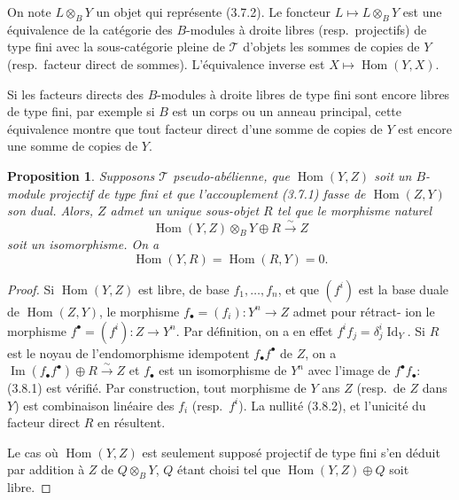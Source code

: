 \documentclass[11pt,a4paper]{article}
\theoremstyle{plain}
\newtheorem{proposition}[theorem]{Proposition}
\theoremstyle{definition}
\DeclareMathOperator{\Hom}{Hom}
\DeclareMathOperator{\im}{Im}
\newcommand{\isom}{\xrightarrow{\sim}}
\DeclareMathOperator{\Id}{Id}
\begin{document}
On note $L \otimes_B Y$ un objet qui repr\'esente (3.7.2). Le foncteur $L \mapsto L \otimes_B Y$ est une \'equivalence de la cat\'egorie des $B$-modules \`a droite libres (resp.~projectifs) de type fini avec la sous-cat\'egorie pleine de $\mathcal{T}$ d'objets les sommes de copies de $Y$ (resp.~facteur direct de sommes). L'\'equivalence inverse est $X \mapsto \Hom(Y, X)$.

Si les facteurs directs des $B$-modules \`a droite libres de type fini sont encore libres de type fini, par exemple si $B$ est un corps ou un anneau principal, cette \'equivalence montre que tout facteur direct d'une somme de copies de $Y$ est encore une somme de copies de $Y$.

\begin{proposition}
Supposons $\mathcal{T}$ pseudo-ab\'elienne, que $\Hom(Y, Z)$ soit un $B$-module projectif de type fini et que l'accouplement (3.7.1) fasse de $\Hom(Z, Y)$ son dual. Alors, $Z$ admet un unique sous-objet $R$ tel que le morphisme naturel
\begin{equation}
\Hom(Y, Z) \otimes_B Y \oplus R \isom Z \tag{3.8.1}
\end{equation}
soit un isomorphisme. On a
\begin{equation}
\Hom(Y, R) = \Hom(R, Y) = 0. \tag{3.8.2}
\end{equation}
\end{proposition}

\begin{proof}
Si $\Hom(Y, Z)$ est libre, de base $f_1, \ldots, f_n$, et que $(f^i)$ est la base duale de $\Hom(Z, Y)$, le morphisme $f_\bullet = (f_i) : Y^n \to Z$ admet pour r\'etract-
ion le morphisme $f^\bullet = (f^i) : Z \to Y^n$. Par d\'efinition, on a en effet $f^i f_j = \delta^i_j \Id_Y$. Si $R$ est le noyau de l'endomorphisme idempotent $f_\bullet f^\bullet$ de $Z$, on a $\im(f_\bullet f^\bullet) \oplus R \isom Z$ et $f_\bullet$ est un isomorphisme de $Y^n$ avec l'image de $f^\bullet f_\bullet$: (3.8.1) est v\'erifi\'e. Par construction, tout morphisme de $Y$ ans $Z$ (resp.~de $Z$ dans $Y$) est combinaison lin\'eaire des $f_i$ (resp.~$f^i$). La nullit\'e (3.8.2), et l'unicit\'e du facteur direct $R$ en r\'esultent.

Le cas o\`u $\Hom(Y, Z)$ est seulement suppos\'e projectif de type fini s'en d\'eduit par addition \`a $Z$ de $Q \otimes_B Y$, $Q$ \'etant choisi tel que $\Hom(Y, Z) \oplus Q$ soit libre.
\end{proof}
\end{document}
